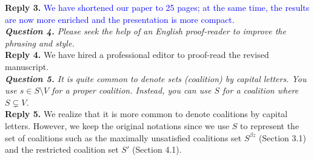 \documentclass[11pt]{article}
\begin{document}
\noindent \textbf{Reply 3.}
\textcolor{blue}{We have shortened our paper to 25 pages; at the same time,  the results are now more enriched and the presentation is more compact.}
\\[4mm]
%
%
%
\noindent \textit{\textbf{Question 4.}
Please seek the help of an English proof-reader to improve the phrasing and style.
}
\\[2mm]
\noindent \textbf{Reply 4.}
We have hired a professional editor to proof-read the revised manuscript.
\\[4mm]
%
%
%
\noindent \textit{\textbf{Question 5.}
It is quite common to denote sets (coalition) by capital letters. You use $s \in S \setminus V$ for a proper coalition. Instead, you can use $S$ for a coalition where $S \subsetneq V$.
}
\\[2mm]
\noindent \textbf{Reply 5.}
We realize that it is more common to denote coalitions by capital letters.
However, we keep the original notations since we use $S$ to represent the set of coalitions such as the maximally unsatisfied coalitions set $S^{\beta z}$ (Section 3.1) and the restricted coalition set $S'$ (Section 4.1). 
%
%
%






\newpage
\end{document}
